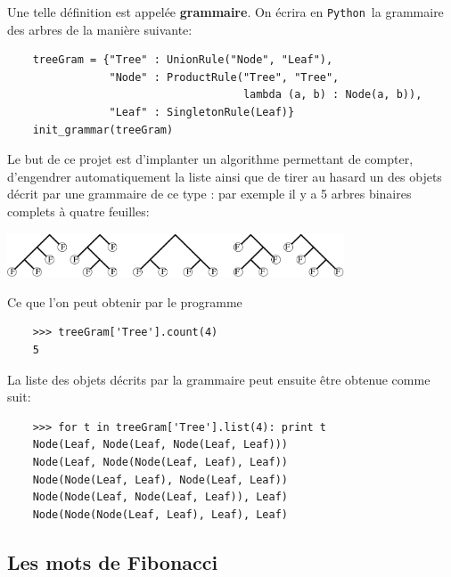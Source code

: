 \documentclass[11pt]{article}
\renewcommand{\emph}[1]{\textbf{#1}}
\newcommand{\Python}{\texttt{Python}}
\begin{document}
Une telle définition est appelée \emph{grammaire}. On écrira en
\Python\ la grammaire des arbres de la manière suivante:
\begin{verbatim}
    treeGram = {"Tree" : UnionRule("Node", "Leaf"),
                "Node" : ProductRule("Tree", "Tree", 
                                     lambda (a, b) : Node(a, b)),
                "Leaf" : SingletonRule(Leaf)}
    init_grammar(treeGram)
\end{verbatim}
Le but de ce projet est d'implanter un algorithme permettant de compter,
d'engendrer automatiquement la liste ainsi que de tirer au hasard un des
objets décrit par une grammaire de ce type : par exemple il y a 5 arbres
binaires complets à quatre feuilles:
\begin{center}
  \includegraphics[width=10cm]{arbres.pdf}
\end{center}


\noindent Ce que l'on peut obtenir par le programme
\begin{verbatim}
    >>> treeGram['Tree'].count(4)
    5
\end{verbatim}
La liste des objets décrits par la grammaire peut ensuite être obtenue comme
suit:
\begin{verbatim}
    >>> for t in treeGram['Tree'].list(4): print t
    Node(Leaf, Node(Leaf, Node(Leaf, Leaf)))
    Node(Leaf, Node(Node(Leaf, Leaf), Leaf))
    Node(Node(Leaf, Leaf), Node(Leaf, Leaf))
    Node(Node(Leaf, Node(Leaf, Leaf)), Leaf)
    Node(Node(Node(Leaf, Leaf), Leaf), Leaf)
\end{verbatim}


\subsection{Les mots de Fibonacci}
\end{document}
